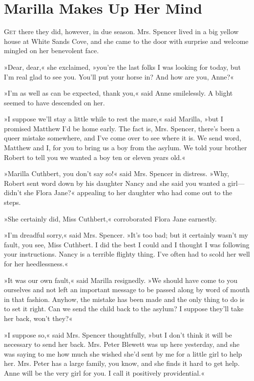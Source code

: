 \chapter{Marilla Makes Up Her Mind}

\lettrine[lines=4]{G}{et} there they did, however, in due season. Mrs. Spencer lived in a big yellow house at White Sands Cove, and she came to the door with surprise and welcome mingled on her benevolent face.

\zz
»Dear, dear,« she exclaimed, »you're the last folks I was looking for today, but I'm real glad to see you. You'll put your horse in? And how are you, Anne?«

»I'm as well as can be expected, thank you,« said Anne smilelessly. A blight seemed to have descended on her.

»I suppose we'll stay a little while to rest the mare,« said Marilla, »but I promised Matthew I'd be home early. The fact is, Mrs. Spencer, there's been a queer mistake somewhere, and I've come over to see where it is. We send word, Matthew and I, for you to bring us a boy from the asylum. We told your brother Robert to tell you we wanted a boy ten or eleven years old.«

»Marilla Cuthbert, you don't say so!« said Mrs. Spencer in distress. »Why, Robert sent word down by his daughter Nancy and she said you wanted a girl—didn't she Flora Jane?« appealing to her daughter who had come out to the steps.

»She certainly did, Miss Cuthbert,« corroborated Flora Jane earnestly.

»I'm dreadful sorry,« said Mrs. Spencer. »It's too bad; but it certainly wasn't my fault, you see, Miss Cuthbert. I did the best I could and I thought I was following your instructions. Nancy is a terrible flighty thing. I've often had to scold her well for her heedlessness.«

»It was our own fault,« said Marilla resignedly. »We should have come to you ourselves and not left an important message to be passed along by word of mouth in that fashion. Anyhow, the mistake has been made and the only thing to do is to set it right. Can we send the child back to the asylum? I suppose they'll take her back, won't they?«

»I suppose so,« said Mrs. Spencer thoughtfully, »but I don't think it will be necessary to send her back. Mrs. Peter Blewett was up here yesterday, and she was saying to me how much she wished she'd sent by me for a little girl to help her. Mrs. Peter has a large family, you know, and she finds it hard to get help. Anne will be the very girl for you. I call it positively providential.«

